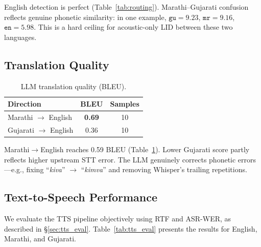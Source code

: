 \documentclass[11pt]{article}
\newcommand{\best}[1]{\textbf{#1}}
\begin{document}
English detection is perfect (Table~\ref{tab:routing}).  Marathi--Gujarati confusion reflects genuine phonetic similarity: in one example, $\texttt{gu}{=}9.23$, $\texttt{mr}{=}9.16$, $\texttt{en}{=}5.98$.  This is a hard ceiling for acoustic-only LID between these two languages.

\subsection{Translation Quality}

\begin{table}[t]
\centering\small
\caption{LLM translation quality (BLEU).}
\label{tab:bleu}
\begin{tabular}{lcc}
\toprule
\textbf{Direction} & \textbf{BLEU} & \textbf{Samples} \\
\midrule
Marathi $\to$ English  & \best{0.69} & 10 \\
Gujarati $\to$ English & 0.36 & 10 \\
\bottomrule
\end{tabular}
\end{table}

Marathi$\to$English reaches 0.59 BLEU (Table~\ref{tab:bleu}).  Lower Gujarati score partly reflects higher upstream STT error.  The LLM genuinely corrects phonetic errors---e.g., fixing ``\textit{kiva}'' $\to$ ``\textit{kimva}'' and removing Whisper's trailing repetitions.

\subsection{Text-to-Speech Performance}\label{sec:tts_results}

We evaluate the TTS pipeline objectively using RTF and ASR-WER, as described in \S\ref{sec:tts_eval}. Table~\ref{tab:tts_eval} presents the results for English, Marathi, and Gujarati.

\begin{table}[h]
\centering\small
\caption{Objective TTS Performance (GPU). RTF $<1.0$ is faster than real-time. ASR-WER measures pronunciation clarity against the original prompt.}
\label{tab:tts_eval}
\end{table}
\end{document}
